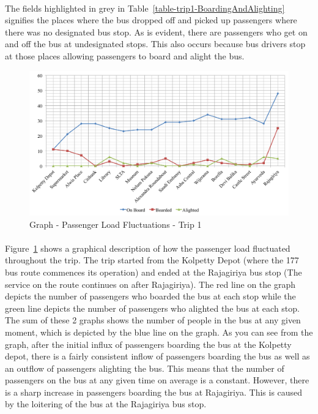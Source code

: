 \paragraph{} The fields highlighted in grey in Table~\ref{table-trip1-BoardingAndAlighting} signifies the places where the bus dropped off and picked up passengers where there was no designated bus stop. As is evident, there are passengers who get on and off the bus at undesignated stops. This also occurs because bus drivers stop at those places allowing passengers to board and alight the bus.

\begin {figure} [H]
\centering
\includegraphics[scale=0.5]{passengerLoadData-Trip1}
\caption [Graph - Passenger Load Fluctuations - Trip 1] {Graph - Passenger Load Fluctuations - Trip 1}
\label {image-passengerLoadData-Trip1}
\end {figure}

\paragraph{} Figure~\ref{image-passengerLoadData-Trip1} shows a graphical description of how the passenger load fluctuated throughout the trip. The trip started from the Kolpetty Depot (where the 177 bus route commences its operation) and ended at the Rajagiriya bus stop (The service on the route continues on after Rajagiriya). The red line on the graph depicts the number of passengers who boarded the bus at each stop while the green line depicts the number of passengers who alighted the bus at each stop. The sum of these 2 graphs shows the number of people in the bus at any given moment, which is depicted by the blue line on the graph. As you can see from the graph, after the initial influx of passengers boarding the bus at the Kolpetty depot, there is a fairly consistent inflow of passengers boarding the bus as well as an outflow of passengers alighting the bus. This means that the number of passengers on the bus at any given time on average is a constant. However, there is a sharp increase in passengers boarding the bus at Rajagiriya. This is caused by the loitering of the bus at the Rajagiriya bus stop. 

